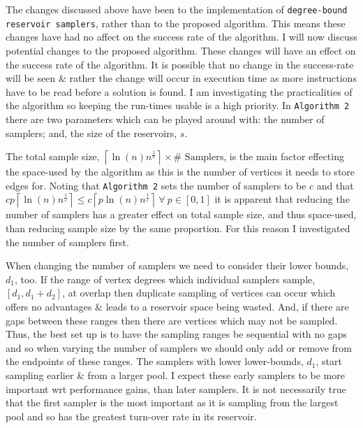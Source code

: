 \documentclass[11pt,twoside,a4paper]{report}
\begin{document}

\par The changes discussed above have been to the implementation of \texttt{degree-bound reservoir samplers}, rather than to the proposed algorithm. This means these changes have had no affect on the success rate of the algorithm. I will now discuss potential changes to the proposed algorithm. These changes will have an effect on the success rate of the algorithm. It is possible that no change in the success-rate will be seen \& rather the change will occur in execution time as more instructions have to be read before a solution is found. I am investigating the practicalities of the algorithm so keeping the run-times usable is a high priority. In \texttt{Algorithm 2} there are two parameters which can be played around with: the number of samplers; and, the size of the reservoirs, $s$.

\par The total sample size, $\left\lceil\ln(n)n^{\frac1c}\right\rceil\times\text{\#\ Samplers}$, is the main factor effecting the space-used by the algorithm as this is the number of vertices it needs to store edges for. Noting that \texttt{Algorithm 2} sets the number of samplers to be $c$ and that $cp\left\lceil\ln(n)n^{\frac1c}\right\rceil\leq c\left\lceil p\ln(n)n^{\frac1c}\right\rceil\ \forall\ p\in[0,1]$ it is apparent that reducing the number of samplers has a greater effect on total sample size, and thus space-used, than reducing sample size by the same proportion. For this reason I investigated the number of samplers first.

\horizontalline

\par When changing the number of samplers we need to consider their lower bounds, $d_1$, too. If the range of vertex degrees which individual samplers sample, $[d_1,d_1+d_2]$, at overlap then duplicate sampling of vertices can occur which offers no advantages \& leads to a reservoir space being wasted. And, if there are gaps between these ranges then there are vertices which may not be sampled. %
Thus, the best set up is to have the sampling ranges be sequential with no gaps and so when varying the number of samplers we should only add or remove from the endpoints of these ranges. The samplers with lower lower-bounds, $d_1$, start sampling earlier \& from a larger pool. I expect these early samplers to be more important wrt performance gains, than later samplers. It is not necessarily true that the first sampler is the most important as it is sampling from the largest pool and so has the greatest turn-over rate in its reservoir.
\end{document}
